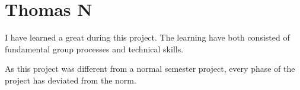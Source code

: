 \section{Thomas N}
I have learned a great during this project. The learning have both consisted of fundamental group processes and technical skills. 

As this project was different from a normal semester project, every phase of the project has deviated from the norm. 